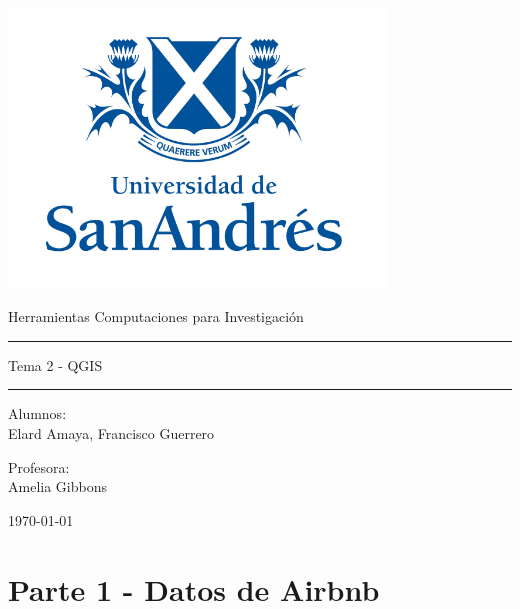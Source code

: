 \documentclass[11pt,a4paper]{article}
\begin{document}
\thispagestyle{empty}
\begin{center}
\includegraphics[width=10cm]{logo udesa.PNG}
\end{center}


	\begin{center}
	\LARGE
	Herramientas Computaciones para Investigación
\\			\vspace{1cm}
\hrule
	\vspace{0.5cm}
	\LARGE
 Tema 2 - QGIS
\\		
		\vspace{0.5cm}
		\hrule
				\vspace{1cm}
	\large

	\vspace{2.5cm}
	\large
		Alumnos:\\
	\large
	Elard Amaya, Francisco Guerrero
	
	
	\vspace{1.3cm}
	\normalsize	
	Profesora:\\

	\normalsize
	Amelia Gibbons
	
	\vspace{1.3cm}
	\today
	\end{center}

	
\clearpage
\section*{Parte 1 - Datos de Airbnb}
\end{document}
